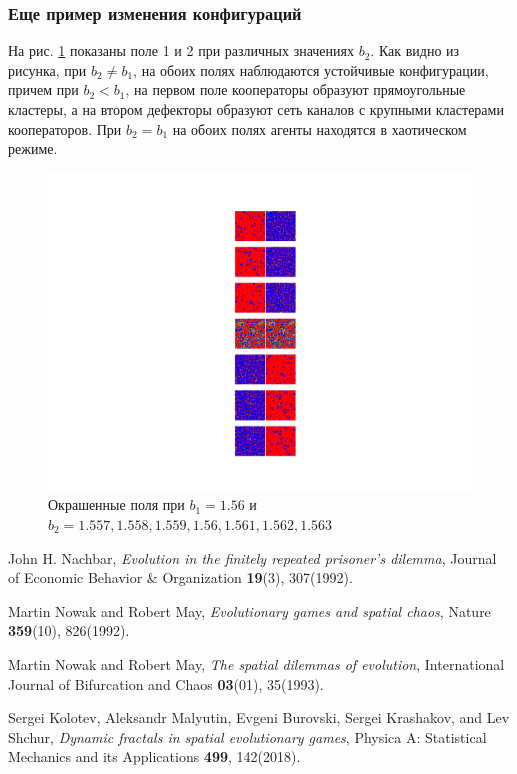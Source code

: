 \documentclass[12pt]{article}
\begin{document}
\subsubsection{Еще пример изменения конфигураций}
    \label{sec:configs}
    На рис. \ref{fig:fields156} показаны поле 1 и 2 при различных значениях $b_2$. Как видно из рисунка, при $b_2\neq b_1$, на обоих полях наблюдаются устойчивые конфигурации, причем при $b_2<b_1$, на первом поле кооператоры образуют прямоугольные кластеры, а на втором дефекторы образуют сеть каналов с крупными кластерами кооператоров. При $b_2=b_1$ на обоих полях агенты находятся в хаотическом режиме.
    \begin{figure}
         \centering
         \includegraphics[width=0.95\columnwidth, keepaspectratio=True]{DoubleField/colored_2fields156.png}
         \caption{Окрашенные поля при $b_1=1.56$ и $b_2=1.557, 1.558, 1.559, 1.56, 1.561, 1.562, 1.563$}
         \label{fig:fields156}
    \end{figure}

\newpage
\begin{thebibliography}{9}
        John H. Nachbar, \textit{Evolution in the finitely repeated prisoner's dilemma}, Journal of Economic Behavior \& Organization \textbf{19}(3), 307(1992).
    
        Martin Nowak and Robert May, \textit{Evolutionary games and spatial chaos}, Nature \textbf{359}(10), 826(1992).

        Martin Nowak and Robert May, \textit{The spatial dilemmas of evolution}, International Journal of Bifurcation and Chaos \textbf{03}(01), 35(1993).

        Sergei Kolotev, Aleksandr Malyutin, Evgeni Burovski, Sergei Krashakov, and Lev Shchur, \textit{Dynamic fractals in spatial evolutionary games}, Physica   A:   Statistical   Mechanics and its Applications \textbf{499}, 142(2018).
\end{thebibliography}
\end{document}
